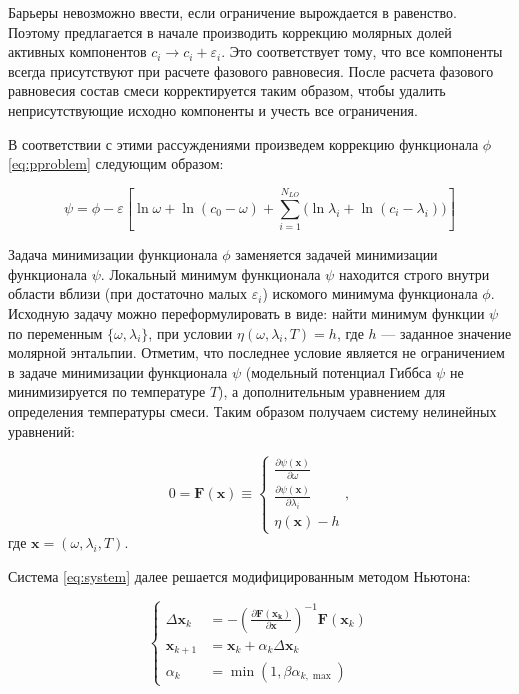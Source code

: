 ﻿\documentclass[12pt]{article}
\newcommand{\pd}[2]{\frac{\partial #1}{\partial #2}}
\renewcommand{\epsilon}{\varepsilon}
\begin{document}
Барьеры невозможно ввести, если ограничение вырождается в равенство. Поэтому предлагается в начале производить
коррекцию молярных долей активных компонентов $c_i \rightarrow c_i + \epsilon_i$. Это соответствует тому, что все
компоненты всегда присутствуют при расчете фазового равновесия. После расчета фазового равновесия состав смеси
корректируется таким образом, чтобы удалить неприсутствующие исходно компоненты и учесть все ограничения.

В соответствии с этими рассуждениями произведем коррекцию функционала $\phi$ \eqref{eq:pproblem} следующим образом:

\begin{equation}
\psi = \phi - \varepsilon \left[ \ln \omega + \ln (c_0 - \omega) + \sum_{i=1}^{N_{LO}} \Big( \ln \lambda_i + \ln (c_i -
\lambda_i) \Big) \right]
\end{equation}

Задача минимизации функционала $\phi$ заменяется задачей минимизации функционала $\psi$. Локальный минимум функционала
$\psi$ находится строго внутри области вблизи (при достаточно малых $\epsilon_i$) искомого минимума функционала $\phi$.
Исходную задачу можно переформулировать в виде: найти минимум функции $\psi$ по переменным $\{\omega, \lambda_i\}$, при
условии $\eta(\omega, \lambda_i, T) = h$, где $h$ --- заданное значение молярной энтальпии. Отметим, что последнее
условие является не ограничением в задаче минимизации функционала $\psi$ (модельный потенциал Гиббса $\psi$ не
минимизируется по температуре $T$), а дополнительным уравнением для определения температуры смеси. Таким образом
получаем систему нелинейных уравнений:

\begin{equation}
0 = \mathbf{F}(\mathbf{x}) \equiv
\begin{cases}
 \pd{\psi(\mathbf{x})}{\omega}\\
 \pd{\psi(\mathbf{x})}{\lambda_i}\\
 \eta(\mathbf{x}) - h
\end{cases},
\label{eq:system}
\end{equation}
где $\mathbf{x} = (\omega, \lambda_i, T)$.

Система \eqref{eq:system} далее решается модифицированным методом Ньютона:

\begin{equation}
\left\{
\begin{aligned}
\Delta \mathbf{x}_k &= -\left(\pd{\mathbf{F(\mathbf{x}_k)}}{\mathbf{x}}\right)^{-1}
\mathbf{F}(\mathbf{x}_k)\\
\mathbf{x}_{k+1} &= \mathbf{x}_k + \alpha_k \Delta \mathbf{x}_k\\
\alpha_k &= \min(1, \beta \alpha_{k, \max})
\end{aligned}
\right. \label{eq:newton}
\end{equation}
\end{document}
